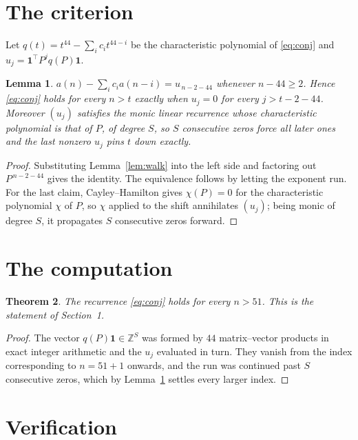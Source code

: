 \documentclass[11pt,a4paper]{article}
\theoremstyle{plain}
\newtheorem{theorem}{Theorem}
\newtheorem{lemma}[theorem]{Lemma}
\theoremstyle{definition}
\begin{document}
\section{The criterion}

Let $q(t)=t^{44}-\sum_i c_i t^{44-i}$ be the characteristic polynomial of
\eqref{eq:conj} and $u_j=\mathbf{1}^{\!\top}P^{j}q(P)\mathbf{1}$.

\begin{lemma}\label{lem:crit}
$a(n)-\sum_i c_i a(n-i)=u_{\,n-2-44}$ whenever $n-44\ge2$. Hence
\eqref{eq:conj} holds for every $n>t$ exactly when $u_j=0$ for every
$j>t-2-44$. Moreover $(u_j)$ satisfies the monic linear recurrence whose
characteristic polynomial is that of $P$, of degree $S$, so $S$ consecutive zeros force all
later ones and the last nonzero $u_j$ pins $t$ down exactly.
\end{lemma}

\begin{proof}
Substituting Lemma~\ref{lem:walk} into the left side and factoring out
$P^{\,n-2-44}$ gives the identity. The equivalence follows by letting the exponent
run. For the last claim, Cayley--Hamilton gives $\chi(P)=0$ for the characteristic
polynomial $\chi$ of $P$, so $\chi$ applied to the shift annihilates $(u_j)$; being monic of
degree $S$, it propagates $S$ consecutive zeros forward.
\end{proof}

\section{The computation}

\begin{theorem}
The recurrence \eqref{eq:conj} holds for every $n>51$. This is the statement of
Section~1.
\end{theorem}

\begin{proof}
The vector $q(P)\mathbf{1}\in\mathbb{Z}^{S}$ was formed by $44$ matrix--vector
products in exact integer arithmetic and the $u_j$ evaluated in turn. They vanish from the
index corresponding to $n=51+1$ onwards, and the run was continued past $S$ consecutive
zeros, which by Lemma~\ref{lem:crit} settles every larger index.
\end{proof}

\section{Verification}
\end{document}
